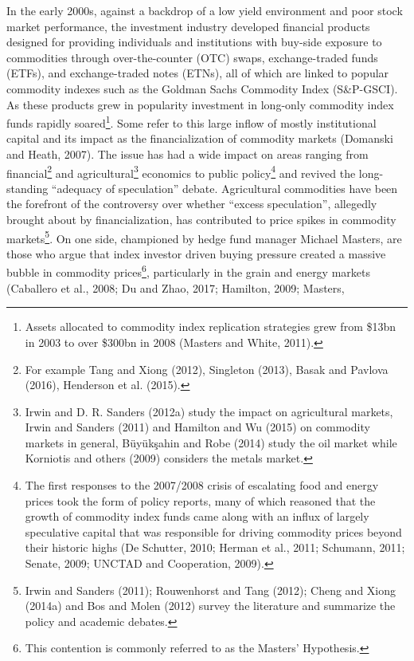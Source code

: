 \documentclass[]{elsarticle} %
\begin{document}
In the early 2000s, against a backdrop of a low yield environment and
poor stock market performance, the investment industry developed
financial products designed for providing individuals and institutions
with buy-side exposure to commodities through over-the-counter (OTC)
swaps, exchange-traded funds (ETFs), and exchange-traded notes (ETNs),
all of which are linked to popular commodity indexes such as the Goldman
Sachs Commodity Index (S\&P-GSCI). As these products grew in popularity
investment in long-only commodity index funds rapidly soared\footnote{Assets
  allocated to commodity index replication strategies grew from \$13bn
  in 2003 to over \$300bn in 2008 (Masters and White, 2011).}. Some
refer to this large inflow of mostly institutional capital and its
impact as the financialization of commodity markets (Domanski and Heath,
2007). The issue has had a wide impact on areas ranging from
financial\footnote{For example Tang and Xiong (2012), Singleton (2013),
  Basak and Pavlova (2016), Henderson et al. (2015).} and
agricultural\footnote{Irwin and D. R. Sanders (2012a) study the impact
  on agricultural markets, Irwin and Sanders (2011) and Hamilton and Wu
  (2015) on commodity markets in general, Büyükşahin and Robe (2014)
  study the oil market while Korniotis and others (2009) considers the
  metals market.} economics to public policy\footnote{The first
  responses to the 2007/2008 crisis of escalating food and energy prices
  took the form of policy reports, many of which reasoned that the
  growth of commodity index funds came along with an influx of largely
  speculative capital that was responsible for driving commodity prices
  beyond their historic highs (De Schutter, 2010; Herman et al., 2011;
  Schumann, 2011; Senate, 2009; UNCTAD and Cooperation, 2009).} and
revived the long-standing ``adequacy of speculation'' debate.
Agricultural commodities have been the forefront of the controversy over
whether ``excess speculation'', allegedly brought about by
financialization, has contributed to price spikes in commodity
markets\footnote{Irwin and Sanders (2011); Rouwenhorst and Tang (2012);
  Cheng and Xiong (2014a) and Bos and Molen (2012) survey the literature
  and summarize the policy and academic debates.}. On one side,
championed by hedge fund manager Michael Masters, are those who argue
that index investor driven buying pressure created a massive bubble in
commodity prices\footnote{This contention is commonly referred to as the
  Masters' Hypothesis.}, particularly in the grain and energy markets
(Caballero et al., 2008; Du and Zhao, 2017; Hamilton, 2009; Masters,
\end{document}
